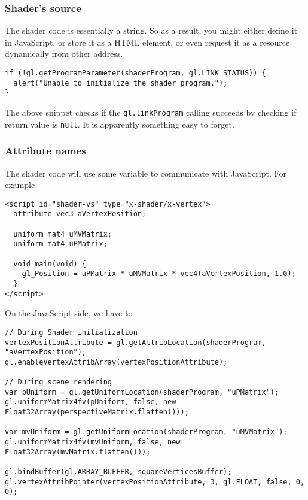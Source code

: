 \subsubsection{Shader's source}\label{shaders-source}

The shader code is essentially a string. So as a result, you might
either define it in JavaScript, or store it as a HTML element, or even
request it as a resource dynamically from other address.

\begin{verbatim}
if (!gl.getProgramParameter(shaderProgram, gl.LINK_STATUS)) {
  alert("Unable to initialize the shader program.");
}
\end{verbatim}

The above snippet checks if the \texttt{gl.linkProgram} calling succeeds
by checking if return value is \texttt{null}. It is apparently something
easy to forget.

\subsubsection{Attribute names}\label{attribute-names}

The shader code will use some variable to communicate with JavaScript.
For example

\begin{verbatim}
<script id="shader-vs" type="x-shader/x-vertex">
  attribute vec3 aVertexPosition;

  uniform mat4 uMVMatrix;
  uniform mat4 uPMatrix;

  void main(void) {
    gl_Position = uPMatrix * uMVMatrix * vec4(aVertexPosition, 1.0);
  }
</script>
\end{verbatim}

On the JavaScript side, we have to

\begin{verbatim}
// During Shader initialization
vertexPositionAttribute = gl.getAttribLocation(shaderProgram, "aVertexPosition");
gl.enableVertexAttribArray(vertexPositionAttribute);

// During scene rendering
var pUniform = gl.getUniformLocation(shaderProgram, "uPMatrix");
gl.uniformMatrix4fv(pUniform, false, new Float32Array(perspectiveMatrix.flatten()));

var mvUniform = gl.getUniformLocation(shaderProgram, "uMVMatrix");
gl.uniformMatrix4fv(mvUniform, false, new Float32Array(mvMatrix.flatten()));

gl.bindBuffer(gl.ARRAY_BUFFER, squareVerticesBuffer);
gl.vertexAttribPointer(vertexPositionAttribute, 3, gl.FLOAT, false, 0, 0);
\end{verbatim}

